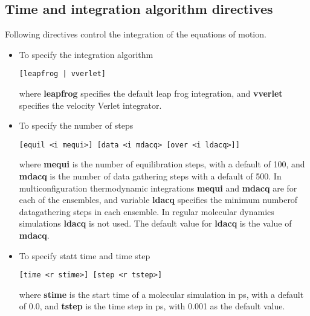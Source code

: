 \subsection{Time and integration algorithm directives}
Following directives control the integration of the equations of motion.
\begin{itemize}
\item
To specify the integration algorithm
\begin{verbatim}
[leapfrog | vverlet]
\end{verbatim}
where {\bf leapfrog} specifies the default leap frog integration, and
{\bf vverlet} specifies the velocity Verlet integrator.
\item
To specify the number of steps
\begin{verbatim}
[equil <i mequi>] [data <i mdacq> [over <i ldacq>]]
\end{verbatim}
where {\bf mequi} is the number of equilibration steps, with a default
of 100, and {\bf mdacq} is the number of data gathering steps with a
default of 500. In multiconfiguration thermodynamic integrations
{\bf mequi} and {\bf mdacq} are for each of the ensembles, and
variable {\bf ldacq} specifies the minimum numberof datagathering steps 
in each ensemble. In regular molecular dynamics simulations {\bf ldacq}
is not used. The default value for {\bf ldacq} is the value of {\bf mdacq}.
\item
To specify statt time and time step
\begin{verbatim}
[time <r stime>] [step <r tstep>]
\end{verbatim}
where {\bf stime} is the start time of a molecular simulation in ps,
with a default of 0.0, and {\bf tstep} is the time step in ps, with
0.001 as the default value.
\end{itemize}
